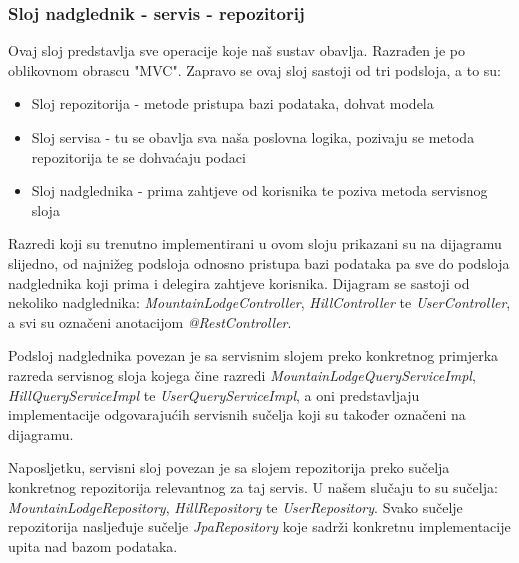 			\subsubsection{Sloj nadglednik - servis - repozitorij}
			Ovaj sloj predstavlja sve operacije koje naš sustav obavlja. Razrađen je po oblikovnom obrascu "MVC". Zapravo se ovaj sloj sastoji od tri podsloja, a to su: 
			\begin{itemize}
				\item 
					Sloj repozitorija - metode pristupa bazi podataka, dohvat modela
				\item
					Sloj servisa - tu se obavlja sva naša poslovna logika, pozivaju se metoda repozitorija te se dohvaćaju podaci
				\item Sloj nadglednika - prima zahtjeve od korisnika te poziva metoda servisnog sloja	
			\end{itemize}
			Razredi koji su trenutno implementirani u ovom sloju prikazani su na dijagramu slijedno, od najnižeg podsloja odnosno pristupa bazi podataka pa sve do podsloja nadglednika koji prima i delegira zahtjeve korisnika.
			Dijagram se sastoji od nekoliko nadglednika: \textit{MountainLodgeController}, \textit{HillController} te \textit{UserController}, a svi su označeni anotacijom \textit{@RestController}. 
			
			Podsloj nadglednika povezan je sa servisnim slojem preko konkretnog primjerka razreda servisnog sloja kojega čine razredi \textit{MountainLodgeQueryServiceImpl}, \textit{HillQueryServiceImpl} te \textit{UserQueryServiceImpl}, a oni predstavljaju implementacije odgovarajućih servisnih sučelja koji su također označeni na dijagramu.
			
			 Naposljetku, servisni sloj povezan je sa slojem repozitorija preko sučelja konkretnog repozitorija relevantnog za taj servis. U našem slučaju to su sučelja: \textit{MountainLodgeRepository}, \textit{HillRepository} te \textit{UserRepository}. Svako sučelje repozitorija nasljeđuje sučelje \textit{JpaRepository} koje sadrži konkretnu implementacije upita nad bazom podataka.
			 
